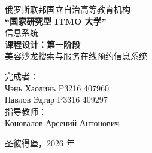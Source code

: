 \begin{titlepage}
\centering
俄罗斯联邦国立自治高等教育机构\\
\textbf{“国家研究型 ITMO 大学”}\\
\vfill
信息系统\\
\vspace{0.5\baselineskip}
\textbf{课程设计：第一阶段}\\
\vspace{0.5\baselineskip}
美容沙龙搜索与服务在线预约信息系统\\
\vfill
\begin{flushright}
完成者：\\
Чэнь Хаолинь P3216 407960\\
Павлов Эдгар P3316 409297\\
指导教师：\\
Коновалов Арсений Антонович\\
\end{flushright}
\vspace{4\baselineskip}
\centering
圣彼得堡，2026 年
\end{titlepage}

